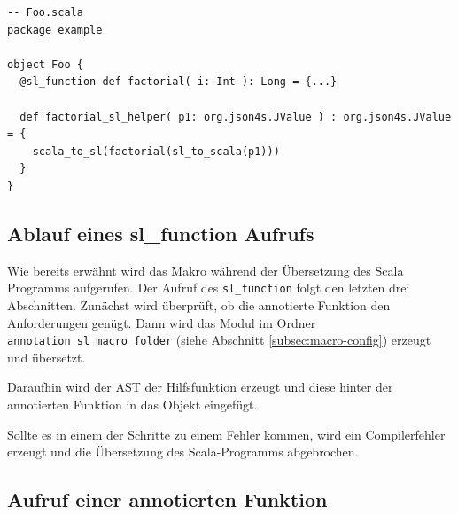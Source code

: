 \documentclass[12pt,bibtotoc]{scrreprt}
\begin{document}
\begin{lstlisting}[caption=Hilfsfunktion zur Funktion aus Listing \ref{lst:example-function}, label=lst:helperfunction, float=h]
-- Foo.scala
package example

object Foo {
  @sl_function def factorial( i: Int ): Long = {...}
  
  def factorial_sl_helper( p1: org.json4s.JValue ) : org.json4s.JValue = {
    scala_to_sl(factorial(sl_to_scala(p1)))
  }
}
\end{lstlisting}

\subsection{Ablauf eines sl\_function Aufrufs}

Wie bereits erwähnt wird das Makro während der Übersetzung des Scala Programms aufgerufen. Der Aufruf des \lstinline!sl_function! folgt den letzten drei Abschnitten. Zunächst wird überprüft, ob die annotierte Funktion den Anforderungen genügt. Dann wird das Modul im Ordner \lstinline!annotation_sl_macro_folder! (siehe Abschnitt \ref{subsec:macro-config}) erzeugt und übersetzt.

Daraufhin wird der \ac{AST} der Hilfsfunktion erzeugt und diese hinter der annotierten Funktion in das Objekt eingefügt. 

Sollte es in einem der Schritte zu einem Fehler kommen, wird ein Compilerfehler erzeugt und die Übersetzung des Scala-Programms abgebrochen.

\subsection{Aufruf einer annotierten Funktion}
\label{subs:call-scala-functions}
\end{document}

